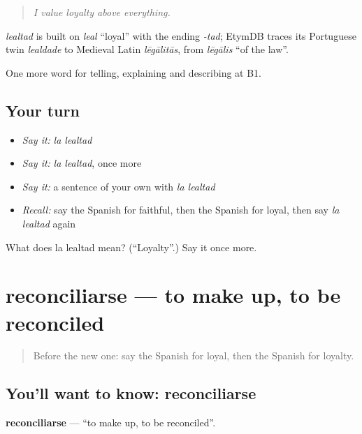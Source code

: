 \begin{quote}
\emph{I value loyalty above everything.}
\end{quote}

\begin{cousinweb}
\emph{lealtad} is built on \emph{leal} \textquotedblleft{}loyal\textquotedblright{} with the ending \emph{-tad}; EtymDB traces its Portuguese twin \emph{lealdade} to Medieval Latin \emph{lēgālitās}, from \emph{lēgālis} \textquotedblleft{}of the law\textquotedblright{}.
\end{cousinweb}

\begin{grammarlens}[title={What you've built}]
One more word for telling, explaining and describing at B1.
\end{grammarlens}

\subsection*{Your turn}
\begin{itemize}
\raggedright
  \item \emph{Say it:} \emph{la lealtad}
  \item \emph{Say it:} \emph{la lealtad}, once more
  \item \emph{Say it:} a sentence of your own with \emph{la lealtad}
  \item \emph{Recall:} say the Spanish for faithful, then the Spanish for loyal, then say \emph{la lealtad} again
\end{itemize}

\begin{tcolorbox}[breakable,colback=teal!4,colframe=teal!35!black,title={Before you move on}]
What does la lealtad mean? (\textquotedblleft{}Loyalty\textquotedblright{}.) Say it once more.
\end{tcolorbox}
\section[reconciliarse]{reconciliarse — to make up, to be reconciled}

\label{lesson:ES-C725-reconciliarse}



\begin{quote}
Before the new one: say the Spanish for loyal, then the Spanish for loyalty.
\end{quote}

\subsection*{You'll want to know: reconciliarse}
\textbf{reconciliarse} — \textquotedblleft{}to make up, to be reconciled\textquotedblright{}.

